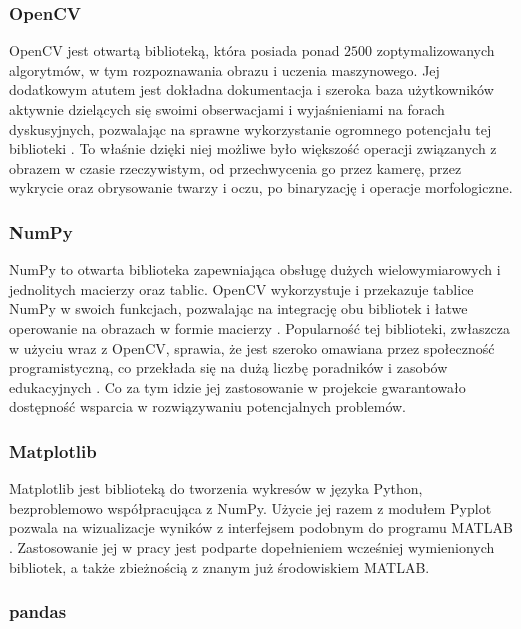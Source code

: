 \documentclass[a4paper,twoside,12pt]{book}
\begin{document}
\subsubsection{OpenCV}

OpenCV jest otwartą biblioteką, która posiada ponad $2500$ zoptymalizowanych algorytmów, w tym rozpoznawania obrazu i uczenia maszynowego. Jej dodatkowym atutem jest dokładna dokumentacja i szeroka baza użytkowników aktywnie dzielących się swoimi obserwacjami i wyjaśnieniami na forach dyskusyjnych, pozwalając na sprawne wykorzystanie ogromnego potencjału tej biblioteki  \cite{bib:OpenCV-about}. To właśnie dzięki niej możliwe było większość operacji związanych z obrazem w czasie rzeczywistym, od przechwycenia go przez kamerę, przez wykrycie oraz obrysowanie twarzy i oczu, po binaryzację i operacje morfologiczne.

\subsubsection{NumPy}

NumPy to otwarta biblioteka zapewniająca obsługę dużych wielowymiarowych i jednolitych macierzy oraz tablic. OpenCV wykorzystuje i przekazuje tablice NumPy w swoich funkcjach, pozwalając na integrację obu bibliotek i łatwe operowanie na obrazach w formie macierzy \cite{bib:NumPy-quick-start}. Popularność tej biblioteki, zwłaszcza w użyciu wraz z OpenCV, sprawia, że jest szeroko omawiana przez społeczność programistyczną, co przekłada się na dużą liczbę poradników i zasobów edukacyjnych \cite{bib:NumPy-OpenCV}. Co za tym idzie jej zastosowanie w projekcie gwarantowało dostępność wsparcia w rozwiązywaniu potencjalnych problemów.

\subsubsection{Matplotlib}

Matplotlib jest biblioteką do tworzenia wykresów w języka Python, bezproblemowo współpracująca z NumPy. Użycie jej razem z modułem Pyplot pozwala na wizualizacje wyników z interfejsem podobnym do programu MATLAB \cite{bib:Matplotlib-pyplot}. Zastosowanie jej w pracy jest podparte dopełnieniem wcześniej wymienionych bibliotek, a także zbieżnością z znanym już środowiskiem MATLAB.

\subsubsection{pandas}
\end{document}
